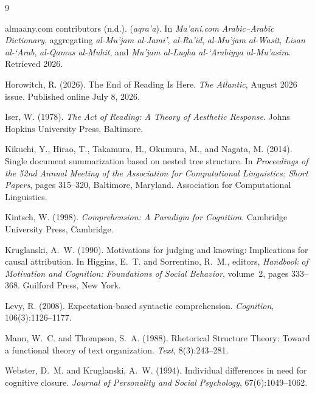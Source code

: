 \documentclass[11pt]{article}
\begin{document}
\begin{thebibliography}{9}

almaany.com contributors (n.d.).
 (\emph{aqra'a}).
\newblock In \emph{Ma'ani.com Arabic--Arabic Dictionary}, aggregating \emph{al-Mu'jam al-Jami'}, \emph{al-Ra'id}, \emph{al-Mu'jam al-Wasit}, \emph{Lisan al-`Arab}, \emph{al-Qamus al-Muhit}, and \emph{Mu'jam al-Lugha al-`Arabiyya al-Mu'asira}. Retrieved 2026.

Horowitch, R. (2026).
\newblock The End of Reading Is Here.
\newblock \emph{The Atlantic}, August 2026 issue. Published online July 8, 2026.

Iser, W. (1978).
\newblock \emph{The Act of Reading: A Theory of Aesthetic Response}.
\newblock Johns Hopkins University Press, Baltimore.

Kikuchi, Y., Hirao, T., Takamura, H., Okumura, M., and Nagata, M. (2014).
\newblock Single document summarization based on nested tree structure.
\newblock In \emph{Proceedings of the 52nd Annual Meeting of the Association for Computational Linguistics: Short Papers}, pages 315--320, Baltimore, Maryland. Association for Computational Linguistics.

Kintsch, W. (1998).
\newblock \emph{Comprehension: A Paradigm for Cognition}.
\newblock Cambridge University Press, Cambridge.

Kruglanski, A.~W. (1990).
\newblock Motivations for judging and knowing: Implications for causal attribution.
\newblock In Higgins, E.~T. and Sorrentino, R.~M., editors, \emph{Handbook of Motivation and Cognition: Foundations of Social Behavior}, volume~2, pages 333--368. Guilford Press, New York.

Levy, R. (2008).
\newblock Expectation-based syntactic comprehension.
\newblock \emph{Cognition}, 106(3):1126--1177.

Mann, W.~C. and Thompson, S.~A. (1988).
\newblock Rhetorical Structure Theory: Toward a functional theory of text organization.
\newblock \emph{Text}, 8(3):243--281.

Webster, D.~M. and Kruglanski, A.~W. (1994).
\newblock Individual differences in need for cognitive closure.
\newblock \emph{Journal of Personality and Social Psychology}, 67(6):1049--1062.


\end{thebibliography}
\end{document}
